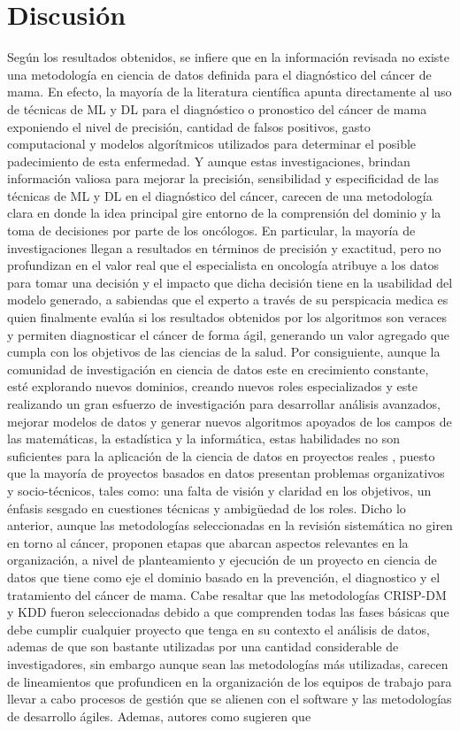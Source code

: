 \section{Discusión}
Según los resultados obtenidos, se infiere que en la información revisada no existe una metodología en ciencia de datos definida para el diagnóstico del cáncer de mama. En efecto, la mayoría de la literatura científica apunta directamente al uso de técnicas de ML y DL para el diagnóstico o pronostico del cáncer de mama exponiendo el nivel de precisión, cantidad de falsos positivos, gasto computacional y modelos algorítmicos utilizados para determinar el posible padecimiento de esta enfermedad. Y aunque estas investigaciones, brindan información valiosa para mejorar la precisión, sensibilidad y especificidad de las técnicas de ML y DL en el diagnóstico del cáncer, carecen de una metodología clara en donde la idea principal gire entorno de la comprensión del dominio y la toma de decisiones por parte de los oncólogos. En particular, la mayoría de investigaciones llegan a resultados en términos de precisión y exactitud, pero no profundizan en el valor real que el especialista en oncología atribuye a los datos para tomar una decisión y el impacto que dicha decisión tiene en la usabilidad del modelo generado, a sabiendas que el experto a través de su perspicacia medica es quien finalmente evalúa si los resultados obtenidos por los algoritmos son veraces y permiten diagnosticar el cáncer de forma ágil, generando un valor agregado que cumpla con los objetivos de las ciencias de la salud. Por consiguiente, aunque la comunidad de investigación en ciencia de datos este en crecimiento constante, esté explorando nuevos dominios, creando nuevos roles especializados y este realizando un gran esfuerzo de investigación para desarrollar análisis avanzados, mejorar modelos de datos y generar nuevos algoritmos apoyados de los campos de las matemáticas, la estadística y la informática, estas habilidades no son suficientes para la aplicación de la ciencia de datos en proyectos reales \citep{Martinez2021}, puesto que la mayoría de proyectos basados en datos presentan problemas organizativos y socio-técnicos, tales como: una falta de visión y claridad en los objetivos, un énfasis sesgado en cuestiones técnicas y ambigüedad de los roles. Dicho lo anterior, aunque las metodologías seleccionadas en la revisión sistemática no giren en torno al cáncer, proponen etapas que abarcan aspectos relevantes en la organización, a nivel de planteamiento y ejecución de un proyecto en ciencia de datos que tiene como eje el dominio basado en la prevención, el diagnostico y el tratamiento del cáncer de mama. Cabe resaltar que las metodologías CRISP-DM y KDD fueron seleccionadas debido a que comprenden todas las fases básicas que debe cumplir cualquier proyecto que tenga en su contexto el análisis de datos, ademas de que son bastante utilizadas por una cantidad considerable de investigadores, sin embargo aunque sean las metodologías más utilizadas, carecen de lineamientos que profundicen en la organización de los equipos de trabajo para llevar a cabo procesos de gestión que se alienen con el software y las metodologías de desarrollo ágiles. Ademas, autores como \citep{Martinez2021} sugieren que 
